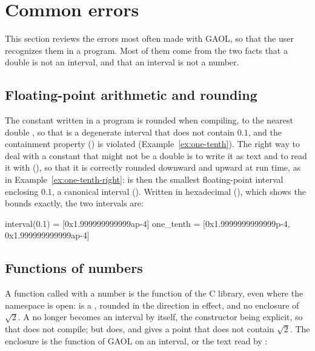 \section{Common errors}\label{sec:common-errors}
%

This section reviews the errors most often made with GAOL, so that the user
recognizes them in a program. Most of them come from the two facts that a
double is not an interval, and that an interval is not a number.

\subsection{Floating-point arithmetic and rounding}
%

The constant  written in a program is rounded when compiling, to the
nearest double , so that 
is a degenerate interval that does not contain $0.1$, and the containment
property () is violated
(Example~\ref{ex:one-tenth}). The right way to deal with a constant that might
not be a double is to write it as text and to read it with
 (), so that it is
correctly rounded downward and upward at run time, as in
Example~\ref{ex:one-tenth-right}:  is then the smallest
floating-point interval enclosing $0.1$, a canonical interval
().
%
Written in hexadecimal (), which shows the bounds
exactly, the two intervals are:

\begin{onscreen}
interval(0.1) = [0x1.999999999999ap-4]
one_tenth     = [0x1.9999999999999p-4, 0x1.999999999999ap-4]
\end{onscreen}

\subsection{Functions of numbers}
%

A function called with a number is the function of the C library, even where
the namespace  is open:  is a ,
rounded in the direction in effect, and no enclosure of $\sqrt{2}$. A
 no longer becomes an interval by itself, the constructor being
explicit, so that  does not compile; but
 does, and gives a point that does not contain
$\sqrt{2}$. The enclosure is the function of GAOL on an interval, or the text
read by :\newinvfive

